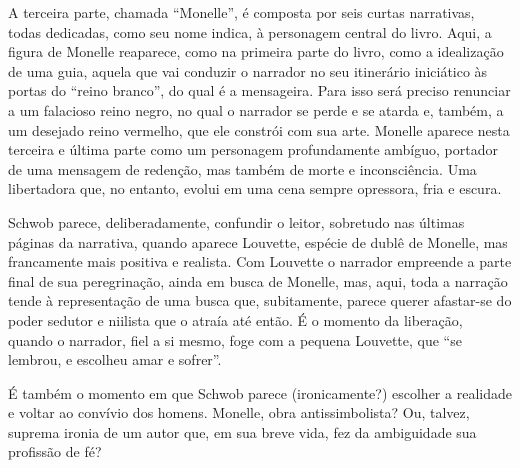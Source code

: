 A terceira parte, chamada ``Monelle'', é composta por seis curtas
narrativas, todas dedicadas, como seu nome indica, à personagem central do
livro. Aqui, a figura de Monelle reaparece, como na
primeira parte do livro, como a idealização de uma guia, aquela que vai conduzir
o narrador no seu itinerário iniciático às portas do “reino branco”, do qual é
a mensageira. Para isso será preciso renunciar a um falacioso reino negro, no
qual o narrador se perde e se atarda e, também, a um desejado reino vermelho,
que ele constrói com sua arte. Monelle aparece nesta terceira e última parte
como um personagem profundamente ambíguo, portador de uma mensagem de redenção,
mas também de morte e inconsciência. Uma libertadora que, no entanto, evolui em
uma cena sempre opressora, fria e escura.

Schwob parece, deliberadamente, confundir o leitor, sobretudo nas últimas
páginas da narrativa, quando aparece Louvette, espécie de dublê de Monelle, mas
francamente mais positiva e realista. Com Louvette o narrador empreende a parte
final de sua peregrinação, ainda em busca de Monelle, mas, aqui, toda a
narração tende à representação de uma busca que, subitamente, parece querer
afastar-se do poder sedutor e niilista que o atraía até então. É o momento da
liberação, quando o narrador, fiel a si mesmo, foge com a pequena Louvette, que
“se lembrou, e escolheu amar e sofrer”.

É também o momento em que Schwob parece (ironicamente?) escolher a realidade
e voltar ao convívio dos homens. Monelle, obra antissimbolista? Ou, talvez,
suprema ironia de um autor que, em sua breve vida, fez da ambiguidade sua
profissão de fé?

